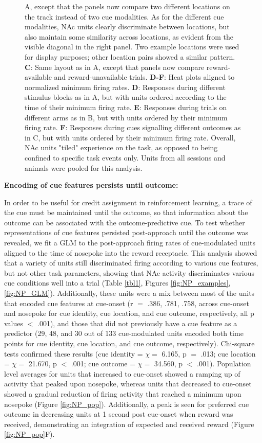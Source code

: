 \documentclass[11pt]{article}
\newcommand{\bsf}[1]{\textbf{#1}}
\begin{document}
\begin{figure}[ht!]
{A, except that the panels now compare two different locations on the track
instead of two cue modalities. As for the different cue modalities, NAc units
clearly discriminate between locations, but also maintain some similarity
across locations, as evident from the visible diagonal in the right panel. Two
example locations were used for display purposes; other location pairs showed
a similar pattern. \bsf{C}: Same layout as in A, except that panels now
compare reward-available and reward-unavailable trials. \bsf{D-F}: Heat plots
aligned to normalized minimum firing rates. \bsf{D}: Responses during
different stimulus blocks as in A, but with units ordered according to the
time of their minimum firing rate. \bsf{E}: Responses during trials on
different arms as in B, but with units ordered by their minimum firing
rate. \bsf{F}: Responses during cues signalling different outcomes as in C,
but with units ordered by their minimum firing rate. Overall, NAc units
"tiled" experience on the task, as opposed to being confined to specific task
events only. Units from all sessions and animals were pooled for this
analysis.}
\label{fig:tiling}
\end{figure} \clearpage

{\bf Encoding of cue features persists until outcome:}

In order to be useful for credit assignment in reinforcement learning, a trace of the cue must be maintained until the outcome, so that information about the outcome can be associated with the outcome-predictive cue. To test whether representations of cue features persisted post-approach until the outcome was revealed, we fit a GLM to the post-approach firing rates of cue-modulated units aligned to the time of nosepoke into the reward receptacle. This analysis
showed that a variety of units still discriminated firing according to various cue features, but not other task parameters, showing that NAc activity discriminates various cue conditions well into a trial (Table \ref{tbl1}, Figures \ref{fig:NP_examples},\ref{fig:NP_GLM}). Additionally, these units were a mix between most of the units that encoded cue features at cue-onset (r $=$ .386, .781, .758, across cue-onset and nosepoke for cue identity, cue location, and cue outcome, respectively, all p values $<$ .001), and those that did not previously have a cue feature as a predictor (29, 48, and 30 out of 133 cue-modulated units encoded both time points for cue identity, cue location, and cue outcome, respectively). Chi-square tests confirmed these results (cue identity =  $\chi =$ 6.165, p $=$ .013; cue location = $\chi =$ 21.670, p $<$ .001; cue outcome = $\chi =$ 34.560, p $<$ .001). Population level averages for units that increased to cue-onset showed a ramping up of activity that peaked upon nosepoke, whereas units that decreased to cue-onset showed a gradual reduction of firing activity that reached a minimum upon nosepoke (Figure \ref{fig:NP_pop}). Additionally, a peak is seen for preferred cue outcome in decreasing units at 1 second post cue-onset when reward was received, demonstrating an integration of expected and received reward (Figure \ref{fig:NP_pop}F). 
\end{document}
